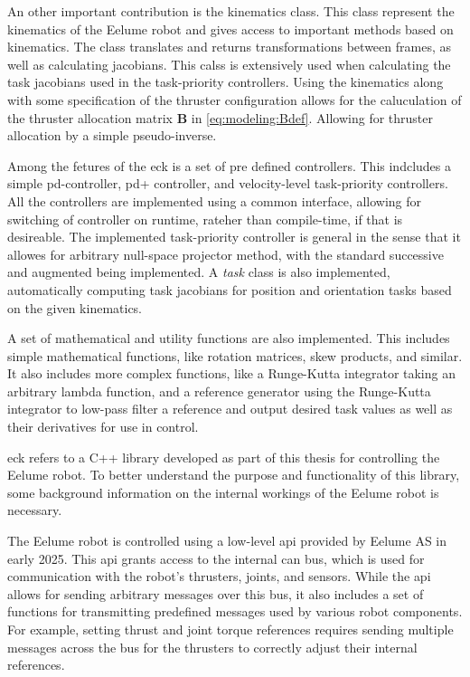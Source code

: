 An other important contribution is the kinematics class. This class represent
the kinematics of the Eelume robot and gives access to important methods based
on kinematics. The class translates and returns transformations between frames,
as well as calculating jacobians. This calss is extensively used when calculating
the task jacobians used in the task-priority controllers. Using the kinematics
along with some specification of the thruster configuration allows for the caluculation
of the thruster allocation matrix \(\bm{B}\) in \autoref{eq:modeling:Bdef}. Allowing
for thruster allocation by a simple pseudo-inverse.

Among the fetures of the \gls{eck} is a set of pre defined controllers. This indcludes a
simple \gls{pd}-controller, \gls{pd+} controller, and velocity-level task-priority controllers.
All the controllers are implemented using a common interface, allowing for switching
of controller on runtime, rateher than compile-time, if that is desireable. The implemented
task-priority controller is general in the sense that it allowes for arbitrary null-space
projector method, with the standard successive and augmented being implemented. A \textit{task}
class is also implemented, automatically computing task jacobians for position and
orientation tasks based on the given kinematics.

A set of mathematical and utility functions are also implemented. This includes
simple mathematical functions, like rotation matrices, skew products, and similar.
It also includes more complex functions, like a Runge-Kutta integrator taking
an arbitrary lambda function, and a reference generator using the Runge-Kutta integrator
to low-pass filter a reference and output desired task values as well as their
derivatives for use in control.
\fi

\gls{eck} refers to a C++ library developed as part of this thesis for controlling the Eelume robot.  
To better understand the purpose and functionality of this library, some background information on the internal workings of the Eelume robot is necessary.

The Eelume robot is controlled using a low-level \gls{api} provided by Eelume AS in early 2025. This \gls{api} grants access to the internal \gls{can} bus, which is used for communication with the robot's thrusters, joints, and sensors. While the \gls{api} allows for sending arbitrary messages over this bus, it also includes a set of functions for transmitting predefined messages used by various robot components. For example, setting thrust and joint torque references requires sending multiple messages across the bus for the thrusters to correctly adjust their internal references.


